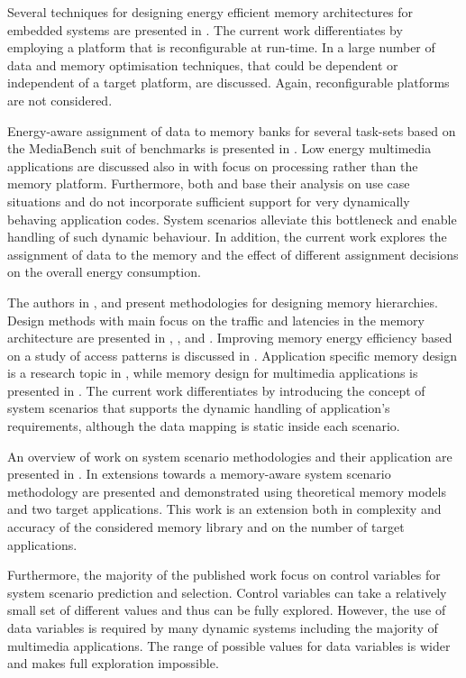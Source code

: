 Several techniques for designing energy efficient memory architectures for embedded systems are presented in \cite{Mac02}. 
The current work differentiates by employing a platform that is reconfigurable at run-time. 
In \cite{Pgk01} a large number of data and memory optimisation techniques, that could be dependent or independent of a target platform, are discussed. 
Again, reconfigurable platforms are not considered.

Energy-aware assignment of data to memory banks for several task-sets based on the MediaBench suit of benchmarks is presented in \cite{Mar03}. 
Low energy multimedia applications are discussed also in \cite{Chu02} with focus on processing rather than the memory platform. 
Furthermore, both \cite{Mar03} and \cite{Chu02} base their analysis on use case situations and do not incorporate sufficient support for very dynamically behaving application codes. 
System scenarios alleviate this bottleneck and enable handling of such dynamic behaviour. 
In addition, the current work explores the assignment of data to the memory and the effect of different assignment decisions on the overall energy consumption.

The authors in \cite{abraham1999automatic}, \cite{jacob1996analytical} and \cite{li1999hardware} present methodologies for designing memory hierarchies.
Design methods with main focus on the traffic and latencies in the memory architecture are presented in \cite{chen1999loop}, \cite{grun2000mist}, \cite{jantsch1994hardware} and \cite{passes1995multi}.
Improving memory energy efficiency based on a study of access patterns is discussed in \cite{kandemir2001improving}.
Application specific memory design is a research topic in \cite{schmit1997synthesis}, while memory design for multimedia applications is presented in \cite{oshima1997high}.
The current work differentiates by introducing the concept of system scenarios that supports the dynamic handling of application's requirements, although the data mapping is static inside each scenario. 

An overview of work on system scenario methodologies and their application are presented in \cite{Gheorghita2007}. 
In \cite{Fil12} extensions towards a memory-aware system scenario methodology are presented and demonstrated using theoretical memory models and two target applications. 
This work is an extension both in complexity and accuracy of the considered memory library and on the number of target applications. 

Furthermore, the majority of the published work focus on control variables for system scenario prediction and selection. 
Control variables can take a relatively small set of different values and thus can be fully explored. However, the use of data variables \cite{Elena2010} is required by many dynamic systems including the majority of multimedia applications. 
The range of possible values for data variables is wider and makes full exploration impossible. 

